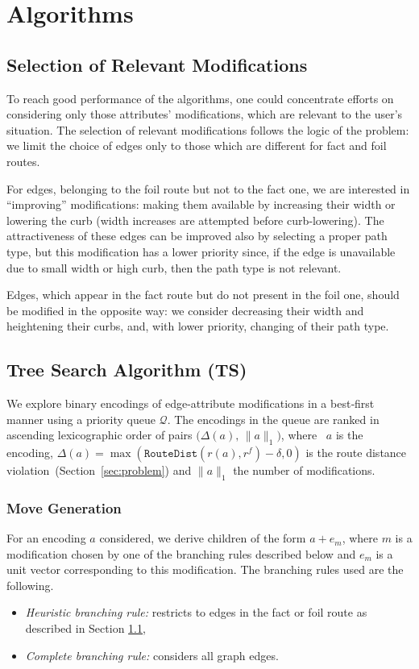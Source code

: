 \documentclass{article}
\begin{document}
\section{Algorithms}
\label{sec:algorithms}

\subsection{Selection of Relevant Modifications}
\label{sec:heuristic_policy}
To reach good performance of the algorithms, one could concentrate efforts on considering only those attributes' modifications, which are relevant to the user's situation.
The selection of relevant modifications follows the logic of the problem: we limit the choice of edges only to those which are different for fact and foil routes.

For edges, belonging to the foil route but not to the fact one, we are interested in ``improving'' modifications: making them available by increasing their width or lowering the curb (width increases are attempted before curb‑lowering).
The attractiveness of these edges can be improved also by selecting a proper path type, but this modification has a lower priority since, if the edge is unavailable due to small width or high curb, then the path type is not relevant.

Edges, which appear in the fact route but do not present in the foil one, should be modified in the opposite way: we consider decreasing their width and heightening their curbs, and, with lower priority, changing of their path type.


\subsection{Tree Search Algorithm (TS)}
\label{sec:tree-search}

We explore binary encodings of edge-attribute modifications in a best‐first manner using a priority queue $\mathcal Q$.  
The encodings in the queue are ranked in ascending lexicographic order of pairs $\bigl(\Delta(a),\,\|a\|_1\bigr)$, where ~$a$ is the encoding, $\Delta(a)=\max(\mathtt{RouteDist}(r(a),r^f) - \delta, 0)$ is the route distance violation~(Section~\ref{sec:problem}) and $\|a\|_1$ the number of modifications.

\subsubsection{Move Generation}
For an encoding $a$ considered, we derive children of the form $a + e_m$, where $m$ is a modification chosen by one of the branching rules described below and $e_m$ is a unit vector corresponding to this modification.
The branching rules used are the following.
\begin{itemize}
  \item \emph{Heuristic branching rule:} restricts to edges in the fact or foil route as described in Section \ref{sec:heuristic_policy},
  \item \emph{Complete branching rule:} considers all graph edges.
\end{itemize}
\end{document}
